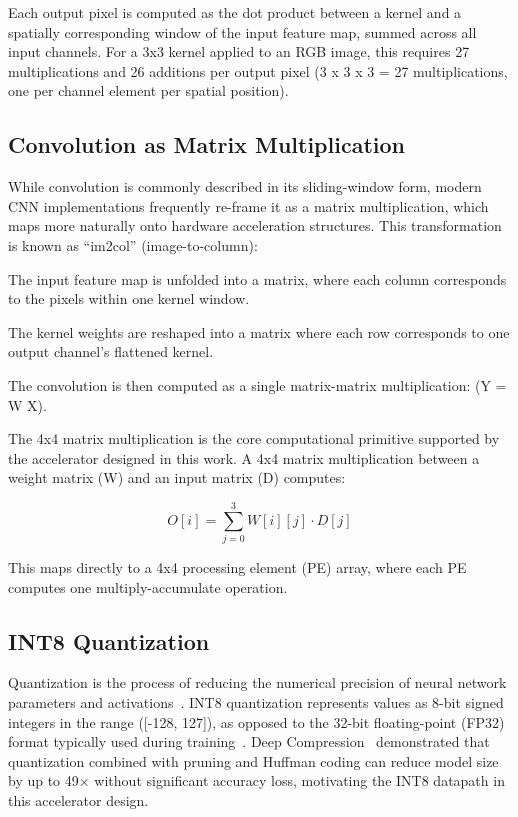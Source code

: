 Each output pixel is computed as the dot product between a kernel and a spatially corresponding window of the input feature map, summed across all input channels. For a 3x3 kernel applied to an RGB image, this requires 27 multiplications and 26 additions per output pixel (3 x 3 x 3 = 27 multiplications, one per channel element per spatial position).


\subsection{Convolution as Matrix Multiplication}

While convolution is commonly described in its sliding-window form, modern CNN implementations frequently re-frame it as a matrix multiplication, which maps more naturally onto hardware acceleration structures. This transformation is known as “im2col” (image-to-column):


The input feature map is unfolded into a matrix, where each column corresponds to the pixels within one kernel window.


The kernel weights are reshaped into a matrix where each row corresponds to one output channel’s flattened kernel.


The convolution is then computed as a single matrix-matrix multiplication: (Y = W X).


The 4x4 matrix multiplication is the core computational primitive supported by the accelerator designed in this work. A 4x4 matrix multiplication between a weight matrix (W) and an input matrix (D) computes:


\[
O[i] = \sum_{j=0}^{3} W[i][j] \cdot D[j]
\]


This maps directly to a 4x4 processing element (PE) array, where each PE computes one multiply-accumulate operation.


\subsection{INT8 Quantization}

Quantization is the process of reducing the numerical precision of neural network parameters and activations~\cite{JACOB_QUANT}. INT8 quantization represents values as 8-bit signed integers in the range ([-128, 127]), as opposed to the 32-bit floating-point (FP32) format typically used during training~\cite{KRISHNAMOORTHI_QUANT}. Deep Compression~\cite{HAN_DEEPCOMPRESS} demonstrated that quantization combined with pruning and Huffman coding can reduce model size by up to 49$\times$ without significant accuracy loss, motivating the INT8 datapath in this accelerator design.


